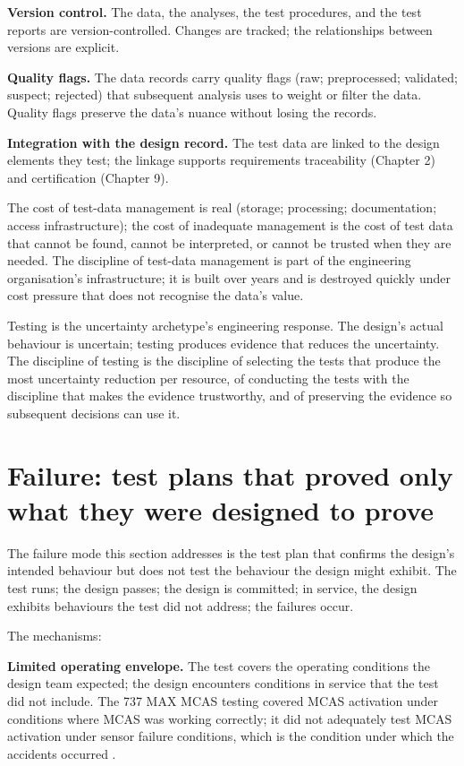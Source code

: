 \textbf{Version control.} The data, the analyses, the test procedures, and the test reports are version-controlled. Changes are tracked; the relationships between versions are explicit.

\textbf{Quality flags.} The data records carry quality flags (raw; preprocessed; validated; suspect; rejected) that subsequent analysis uses to weight or filter the data. Quality flags preserve the data's nuance without losing the records.

\textbf{Integration with the design record.} The test data are linked to the design elements they test; the linkage supports requirements traceability (Chapter 2) and certification (Chapter 9).

The cost of test-data management is real (storage; processing; documentation; access infrastructure); the cost of inadequate management is the cost of test data that cannot be found, cannot be interpreted, or cannot be trusted when they are needed. The discipline of test-data management is part of the engineering organisation's infrastructure; it is built over years and is destroyed quickly under cost pressure that does not recognise the data's value.

\begin{archetype}[uncertainty]
Testing is the uncertainty archetype's engineering response. The design's actual behaviour is uncertain; testing produces evidence that reduces the uncertainty. The discipline of testing is the discipline of selecting the tests that produce the most uncertainty reduction per resource, of conducting the tests with the discipline that makes the evidence trustworthy, and of preserving the evidence so subsequent decisions can use it.
\end{archetype}

\section{Failure: test plans that proved only what they were designed to prove}

The failure mode this section addresses is the test plan that confirms the design's intended behaviour but does not test the behaviour the design might exhibit. The test runs; the design passes; the design is committed; in service, the design exhibits behaviours the test did not address; the failures occur.

The mechanisms:

\textbf{Limited operating envelope.} The test covers the operating conditions the design team expected; the design encounters conditions in service that the test did not include. The 737 MAX MCAS testing covered MCAS activation under conditions where MCAS was working correctly; it did not adequately test MCAS activation under sensor failure conditions, which is the condition under which the accidents occurred \cite{acc:house-737max-2020}.

